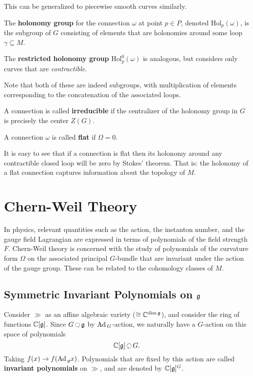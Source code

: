 		This can be generalized to piecewise smooth curves similarly.
		
		\begin{defn}
			The \textbf{holonomy group} for the connection $\omega$ at point $p \in P$, denoted $\mathrm{Hol}_p(\omega)$,  is the subgroup of $G$ consisting of elements that are holonomies around some loop $\gamma \subseteq M$.
			
			The \textbf{restricted holonomy group} $\mathrm{Hol}_p^0(\omega)$ is analogous, but considers only curves that are \emph{contractible}.
		\end{defn}
		Note that both of these are indeed subgroups, with multiplication of elements corresponding to the concatenation of the associated loops.
		
		A connection is called \textbf{irreducible} if the centralizer of the holonomy group in $G$ is precisely the center $Z(G)$.
		
		\begin{defn}
			A connection $\omega$ is called \textbf{flat} if $\Omega = 0$.
		\end{defn}
		It is easy to see that if a connection is flat then its holonomy around any contractible closed loop will be zero by Stokes' theorem. That is: the holonomy of a flat connection captures information about the topology of $M$.
		
		\section{Chern-Weil Theory}
		
		In physics, relevant quantities such as the action, the instanton number, and the gauge field Lagrangian are expressed in terms of polynomials of the field strength $F$. Chern-Weil theory is concerned with the study of polynomials of the curvature form $\Omega$ on the associated principal $G$-bundle that are invariant under the action of the gauge group. These can be related to the cohomology classes of $M$.
		
		\subsection{Symmetric Invariant Polynomials on $\frak g$}
		
		Consider $\gg$ as an affine algebraic variety ($\cong \mathbb{C}^{\dim \frak{g}}$), and consider the ring of functions $\mathbb{C} [\frak{g}]$. Since $G \lacts \gg$ by $\mathrm{Ad}\,_G$-action, we naturally have a $G$-action on this space of polynomials
		\[
			\cc [\gg] \racts G.
		\]
		Taking $f(x) \to f(\mathrm{Ad}\,_g x)$. Polynomials that are fixed by this action are called \textbf{invariant polynomials} on $\gg$, and are denoted by $\mathbb{C}[\frak{g}]^G$.
		
